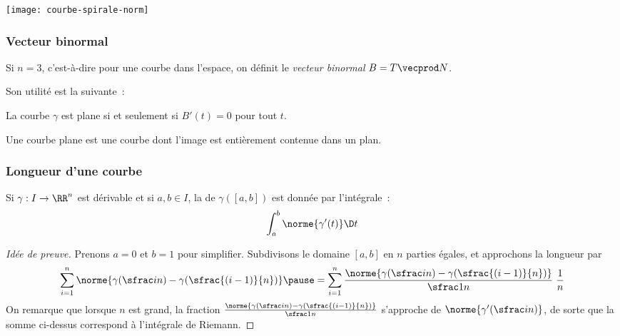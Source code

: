 \begin{frame}
  \begin{minipage}{0.30\linewidth}
    \texttt{[image: courbe-spirale-norm]}
  \end{minipage}
\end{frame}

\subsubsection{Vecteur binormal}
\label{sec:vecteur-binormal}
\begin{frame}
  \begin{definition}
    Si \(n = 3\), c'est-à-dire pour une courbe dans l'espace\pause{}, on définit le \emph{vecteur binormal} \(B = T \vecprod N\).
  \end{definition}\pause{} Son utilité est la suivante~:
  \begin{proposition}
    La courbe \(\gamma\) est plane si et seulement si \(B'(t) = 0\) pour tout \(t\).
  \end{proposition}\pause{}
  \begin{definition}
    Une courbe plane est une courbe dont l'image est entièrement contenue dans un plan.
  \end{definition}
\end{frame}

\subsubsection{Longueur d'une courbe}
\label{sec:longueur-dune-courbe}
\begin{frame}
Si \(\gamma: I \to \RR^{n}\) est dérivable et si \(a, b \in I\), la  de \(\gamma([a,b])\) est donnée par l'intégrale~:
\begin{equation*}
  \int_{a}^{b} \norme{\gamma'(t)}\D t
\end{equation*}
\end{frame}

\begin{frame}
\begin{proof}[Idée de preuve]
  Prenons \(a = 0\) et \(b = 1\) pour simplifier.\pause{} Subdivisons le domaine \([a,b]\) en \(n\) parties égales,\pause{} et approchons la longueur par\pause{}
  \begin{equation*}
    \sum_{i=1}^{n} \norme{\gamma(\sfrac in) - \gamma(\sfrac{(i-1)}{n})}
\pause    =    \sum_{i=1}^{n} \frac{\norme{\gamma(\sfrac in) - \gamma(\sfrac{(i-1)}{n})}}{\sfrac1n} \;\frac 1n
  \end{equation*}\pause{}
  On remarque que lorsque \(n\) est grand, la fraction \(\frac{\norme{\gamma(\sfrac in) - \gamma(\sfrac{(i-1)}{n})}}{\sfrac1n}\)\pause{} s'approche de \(\norme{\gamma'(\sfrac in)}\), de sorte que\pause{} la somme ci-dessus correspond à l'intégrale de Riemann.
\end{proof}
\end{frame}
